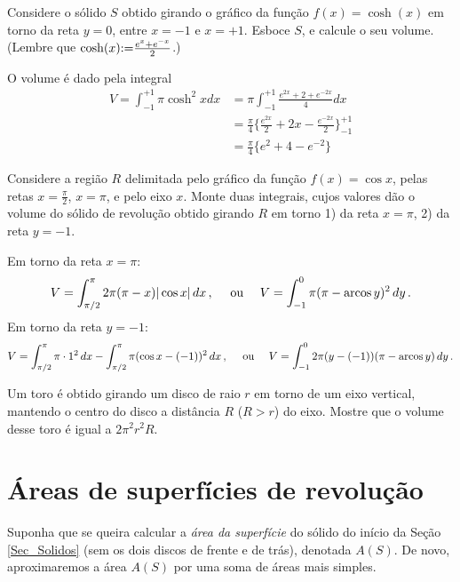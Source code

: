 \begin{exo}
Considere o sólido $S$ obtido girando o gráfico da função $f(x)=\cosh(x)$ em
torno da reta $y=0$, entre $x=-1$ e $x=+1$. Esboce $S$, e calcule o seu volume.
(Lembre que $\cosh(x){:=}\frac{e^x+e^{-x}}{2}$.)
\begin{sol}
O volume é dado pela integral 
\begin{align*}
V=\int_{-1}^{+1}\pi \cosh^2xdx&=\pi\int_{-1}^{+1}\frac{e^{2x}+2+e^{-2x}}{4}dx\\
&=\frac{\pi}{4}\Big\{
\frac{e^{2x}}{2}+2x-\frac{e^{-2x}}{2}
\Big\}_{-1}^{+1}\\
&=\frac{\pi}{4}\big\{e^2+4-e^{-2}\big\}
\end{align*}
\end{sol}
\end{exo}

\begin{exo}
Considere a região $R$ delimitada pelo gráfico da função
$f(x)=\cos x$, pelas retas
$x=\frac{\pi}{2}$, $x=\pi$, e pelo eixo $x$.
Monte duas integrais, cujos valores dão o volume do
sólido de revolução obtido girando
$R$ em torno 1) da reta $x=\pi$, 2) da reta $y=-1$.
\begin{sol}
Em torno da reta $x=\pi$:
$$
V=\int_{\pi/2}^{\pi}2\pi(\pi-x)|\cos x|\,dx\,,\quad\text{ ou }
\quad V=\int_{-1}^0\pi(\pi-\operatorname{arcos} y)^2\,dy\,.
$$
Em torno da reta $y=-1$:
$$
V=\int_{\pi/2}^\pi \pi\cdot 1^2\,dx-\int_{\pi/2}^\pi\pi(\cos
x -(-1))^2\,dx\,,\quad\text{ ou }
\quad V=\int_{-1}^02\pi (y-(-1))(\pi-\operatorname{arcos} y)\,dy\,.
$$
\end{sol}
\end{exo}


\begin{exo}
Um toro é obtido girando um disco de raio $r$ em torno de
um eixo vertical, mantendo o centro do disco a distância
$R$ ($R>r$) do eixo.
Mostre que o volume desse toro é igual a $2\pi^2 r^2R$.
\end{exo}

\section{Áreas de superfícies de revolução}

Suponha que se queira calcular a \emph{área da superfície} do
sólido do início da Seção
\ref{Sec_Solidos} (sem os dois discos de frente
e de trás), denotada $A(S)$.
De novo, aproximaremos a área $A(S)$ por uma soma de áreas mais
simples.\\

